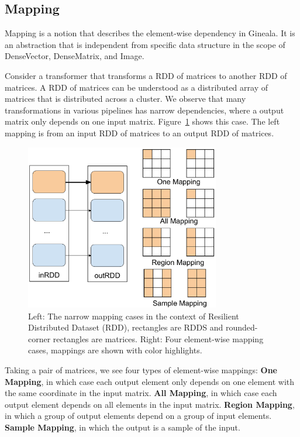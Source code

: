 \documentclass{sig-alternate}
\begin{document}
\subsection{Mapping}
\label{sec:Design-Mapping}
Mapping is a notion that describes the element-wise dependency in Gineala. 
It is an abstraction that is independent from specific data structure in the scope of DenseVector, DenseMatrix, and Image.

Consider a transformer that transforms a RDD of matrices to another RDD of matrices.
A RDD of matrices can be understood as a distributed array of matrices that is distributed across a cluster.
We observe that many transformations in various pipelines has narrow dependencies, where a output matrix
only depends on one input matrix. Figure~\ref{fig:narrowmapping} shows this case. 
The left mapping is from an input RDD of matrices to an output RDD of matrices. 

\begin{figure}[h]
\begin{center}
    \includegraphics[width=85mm]{pictures/narrowmapping}
\caption {Left: The narrow mapping cases in the context of Resilient Distributed Dataset (RDD), rectangles are RDDS and rounded-corner rectangles are matrices.
Right: Four element-wise mapping cases, mappings are shown with color highlights.
    \label{fig:narrowmapping}
}
\end{center}
\end{figure}

Taking a pair of matrices, we see four types of element-wise mappings: 
{\bf One Mapping}, in which case each output element only depends on one element with the same coordinate in the input matrix.
{\bf All Mapping}, in which case each output element depends on all elements in the input matrix.
{\bf Region Mapping}, in which a group of output elements depend on a group of input elements.
{\bf Sample Mapping}, in which the output is a sample of the input.
\end{document}
